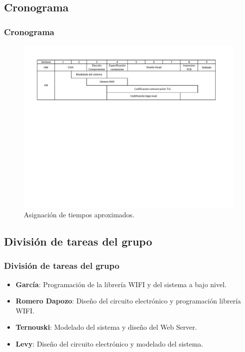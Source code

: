 \subsection{Cronograma}
\begin{frame}
	\frametitle{Cronograma}
    \begin{figure}[htbp]
		\begin{center}
			\includegraphics[width=\textwidth]{diagramas/cronograma.pdf}
			\caption{Asignación de tiempos aproximados.}
			\label{fig:diagrama-cronograma}
		\end{center}
	\end{figure}
\end{frame}

\subsection{División de tareas del grupo}
\begin{frame}
	\frametitle{División de tareas del grupo}
	\begin{itemize}
		\item \textbf{García}: Programación de la librería WIFI y del sistema a bajo nivel.
		\item \textbf{Romero Dapozo}: Diseño del circuito electrónico y programación librería WIFI.
		\item \textbf{Ternouski}: Modelado del sistema y diseño del Web Server.
		\item \textbf{Levy}: Diseño del circuito electrónico y modelado del sistema.
	\end{itemize}
\end{frame}

